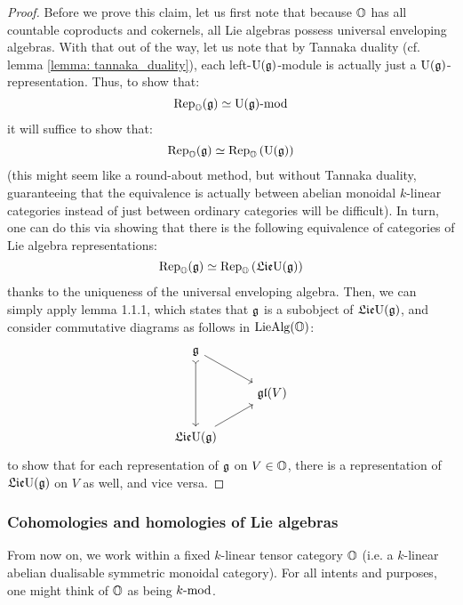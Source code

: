                 \begin{proof}
                    Before we prove this claim, let us first note that because $\O$ has all countable coproducts and cokernels, all Lie algebras possess universal enveloping algebras. With that out of the way, let us note that by Tannaka duality (cf. lemma \ref{lemma: tannaka_duality}), each left-$\U(\g)$-module is actually just a $\U(\g)$-representation. Thus, to show that:
                        $$\Rep_{\O}(\g) \cong {\U(\g)}\mod$$
                    it will suffice to show that:
                        $$\Rep_{\O}(\g) \cong \Rep_{\O}\left(\U(\g)\right)$$
                    (this might seem like a round-about method, but without Tannaka duality, guaranteeing that the equivalence is actually between abelian monoidal $k$-linear categories instead of just between ordinary categories will be difficult). In turn, one can do this via showing that there is the following equivalence of categories of Lie algebra representations:
                        $$\Rep_{\O}(\g) \cong \Rep_{\O}\left(\frakLie \U(\g)\right)$$
                    thanks to the uniqueness of the universal enveloping algebra. Then, we can simply apply lemma 1.1.1, which states that $\g$ is a subobject of $\frakLie \U(\g)$, and consider commutative diagrams as follows in $\Lie\Alg(\O)$:
                        $$
                            \begin{tikzcd}
                            	{\g} \\
                            	& {\frakgl(V)} \\
                            	{\frakLie \U(\g)}
                            	\arrow[from=1-1, to=2-2]
                            	\arrow[from=3-1, to=2-2]
                            	\arrow[from=1-1, to=3-1, tail]
                            \end{tikzcd}
                        $$
                    to show that for each representation of $\g$ on $V \in \O$, there is a representation of $\frakLie \U(\g)$ on $V$ as well, and vice versa.
                \end{proof}
                
        \subsubsection{Cohomologies and homologies of Lie algebras}
            \begin{convention}
                From now on, we work within a fixed $k$-linear tensor category $\O$ (i.e. a $k$-linear abelian dualisable symmetric monoidal category). For all intents and purposes, one might think of $\O$ as being $k\mod$.
            \end{convention}
            
